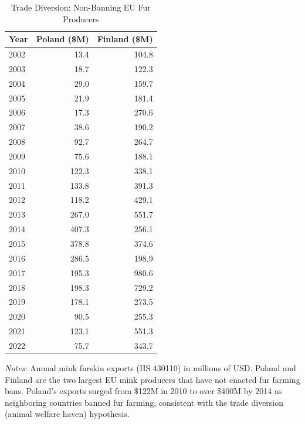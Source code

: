 \begin{table}[t]
\begin{threeparttable}
\centering
\caption{Trade Diversion: Non-Banning EU Fur Producers}
\label{tab:diversion}
\begin{tabular}{lrr}
\toprule
Year & Poland (\$M) & Finland (\$M) \\
\midrule
2002 & 13.4 & 104.8 \\
2003 & 18.7 & 122.3 \\
2004 & 29.0 & 159.7 \\
2005 & 21.9 & 181.4 \\
2006 & 17.3 & 270.6 \\
2007 & 38.6 & 190.2 \\
2008 & 92.7 & 264.7 \\
2009 & 75.6 & 188.1 \\
2010 & 122.3 & 338.1 \\
2011 & 133.8 & 391.3 \\
2012 & 118.2 & 429.1 \\
2013 & 267.0 & 551.7 \\
2014 & 407.3 & 256.1 \\
2015 & 378.8 & 374.6 \\
2016 & 286.5 & 198.9 \\
2017 & 195.3 & 980.6 \\
2018 & 198.3 & 729.2 \\
2019 & 178.1 & 273.5 \\
2020 & 90.5 & 255.3 \\
2021 & 123.1 & 551.3 \\
2022 & 75.7 & 343.7 \\
\bottomrule
\end{tabular}
\begin{tablenotes}
\item \textit{Notes:} Annual mink furskin exports (HS 430110) in millions of USD. Poland and Finland are the two largest EU mink producers that have not enacted fur farming bans. Poland's exports surged from \$122M in 2010 to over \$400M by 2014 as neighboring countries banned fur farming, consistent with the trade diversion (animal welfare haven) hypothesis.
\end{tablenotes}
\end{threeparttable}
\end{table}
